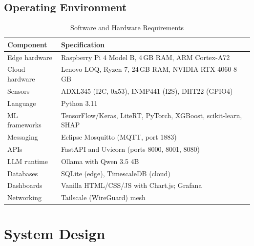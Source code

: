 \documentclass[12pt,a4paper]{report}
\begin{document}
\section{Operating Environment}
\begin{table}[h!]
  \centering
  \caption{Software and Hardware Requirements}
  \label{tab:requirements}
  \vspace*{5pt}
  \footnotesize
  \begin{tabular}{|l|p{9cm}|}
    \hline
    \textbf{Component} & \textbf{Specification} \\ \hline
    Edge hardware & Raspberry Pi 4 Model B, 4\,GB RAM, ARM Cortex-A72 \\ \hline
    Cloud hardware & Lenovo LOQ, Ryzen 7, 24\,GB RAM, NVIDIA RTX 4060 8\,GB \\ \hline
    Sensors & ADXL345 (I2C, 0x53), INMP441 (I2S), DHT22 (GPIO4) \\ \hline
    Language & Python 3.11 \\ \hline
    ML frameworks & TensorFlow/Keras, LiteRT, PyTorch, XGBoost, scikit-learn, SHAP \\ \hline
    Messaging & Eclipse Mosquitto (MQTT, port 1883) \\ \hline
    APIs & FastAPI and Uvicorn (ports 8000, 8001, 8080) \\ \hline
    LLM runtime & Ollama with Qwen 3.5 4B \\ \hline
    Databases & SQLite (edge), TimescaleDB (cloud) \\ \hline
    Dashboards & Vanilla HTML/CSS/JS with Chart.js; Grafana \\ \hline
    Networking & Tailscale (WireGuard) mesh \\ \hline
  \end{tabular}
\end{table}
\clearpage

\chapter{System Design}

\end{document}
